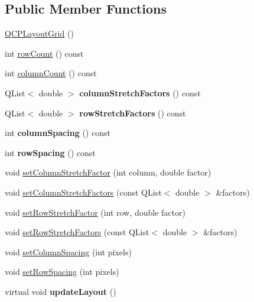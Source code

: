 \subsection*{Public Member Functions}
\begin{DoxyCompactItemize}
\item 
\hyperlink{classQCPLayoutGrid_ab2a4c1587dc8aed4c41c509c8d8d2a64}{Q\+C\+P\+Layout\+Grid} ()
\item 
int \hyperlink{classQCPLayoutGrid_af8e6c7a05864ebe610c87756c7b9079c}{row\+Count} () const 
\item 
int \hyperlink{classQCPLayoutGrid_ac39074eafd148b82d0762090f258189e}{column\+Count} () const 
\item 
\hypertarget{classQCPLayoutGrid_a39bd7994d00687d1b9defef6f1bda835}{}Q\+List$<$ double $>$ {\bfseries column\+Stretch\+Factors} () const \label{classQCPLayoutGrid_a39bd7994d00687d1b9defef6f1bda835}

\item 
\hypertarget{classQCPLayoutGrid_a3744496abf73c8e3b464181d63bb20a7}{}Q\+List$<$ double $>$ {\bfseries row\+Stretch\+Factors} () const \label{classQCPLayoutGrid_a3744496abf73c8e3b464181d63bb20a7}

\item 
\hypertarget{classQCPLayoutGrid_a3de19753fdca81194458cb15156f7315}{}int {\bfseries column\+Spacing} () const \label{classQCPLayoutGrid_a3de19753fdca81194458cb15156f7315}

\item 
\hypertarget{classQCPLayoutGrid_abccdd33c1b284feb6df90fa02f23d9a3}{}int {\bfseries row\+Spacing} () const \label{classQCPLayoutGrid_abccdd33c1b284feb6df90fa02f23d9a3}

\item 
void \hyperlink{classQCPLayoutGrid_ae38f31a71687b9d7ee3104852528fb50}{set\+Column\+Stretch\+Factor} (int column, double factor)
\item 
void \hyperlink{classQCPLayoutGrid_a6c2591d1a7e2534ce036989543b49e57}{set\+Column\+Stretch\+Factors} (const Q\+List$<$ double $>$ \&factors)
\item 
void \hyperlink{classQCPLayoutGrid_a7b0273de5369bd93d942edbaf5b166ec}{set\+Row\+Stretch\+Factor} (int row, double factor)
\item 
void \hyperlink{classQCPLayoutGrid_a200b45f9c908f96ebadaa3c8d87a2782}{set\+Row\+Stretch\+Factors} (const Q\+List$<$ double $>$ \&factors)
\item 
void \hyperlink{classQCPLayoutGrid_a3a49272aba32bb0fddc3bb2a45a3dba0}{set\+Column\+Spacing} (int pixels)
\item 
void \hyperlink{classQCPLayoutGrid_aaef2cd2d456197ee06a208793678e436}{set\+Row\+Spacing} (int pixels)
\item 
\hypertarget{classQCPLayoutGrid_a07f8dd7d3d61d7345026621d446042a4}{}virtual void {\bfseries update\+Layout} ()\label{classQCPLayoutGrid_a07f8dd7d3d61d7345026621d446042a4}


\end{DoxyCompactItemize}
